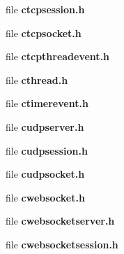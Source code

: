 \begin{DoxyCompactItemize}
\begin{DoxyCompactList}
 \end{DoxyCompactList}\item 
file {\bf ctcpsession.\-h}
\begin{DoxyCompactList}\small\item\em 

 \end{DoxyCompactList}\item 
file {\bf ctcpsocket.\-h}
\begin{DoxyCompactList}\small\item\em 

 \end{DoxyCompactList}\item 
file {\bf ctcpthreadevent.\-h}
\item 
file {\bf cthread.\-h}
\item 
file {\bf ctimerevent.\-h}
\item 
file {\bf cudpserver.\-h}
\item 
file {\bf cudpsession.\-h}
\item 
file {\bf cudpsocket.\-h}
\item 
file {\bf cwebsocket.\-h}
\begin{DoxyCompactList}\small\item\em 

 \end{DoxyCompactList}\item 
file {\bf cwebsocketserver.\-h}
\begin{DoxyCompactList}\small\item\em 

 \end{DoxyCompactList}\item 
file {\bf cwebsocketsession.\-h}
\begin{DoxyCompactList}\small\item\em 

 \end{DoxyCompactList}\end{DoxyCompactItemize}

